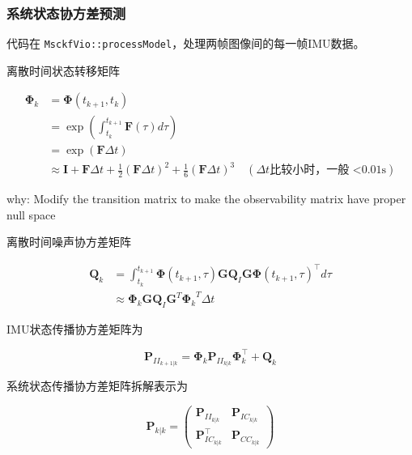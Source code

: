 \documentclass[12pt,a4paper]{article}
\begin{document}
\subsubsection{系统状态协方差预测}

代码在 \verb|MsckfVio::processModel|，处理两帧图像间的每一帧IMU数据。

离散时间状态转移矩阵

\begin{equation}
\begin{aligned}
\boldsymbol{\Phi}_k 
&= \boldsymbol{\Phi}(t_{k+1}, t_k) \\
&= \exp\left(\int_{t_k}^{t_{k+1}} \mathbf{F}(\tau)d\tau\right) \\
&= \exp(\mathbf{F} \Delta t) \\
&\approx 
\mathbf{I} + \mathbf{F} \Delta t + 
\frac{1}{2} (\mathbf{F} \Delta t)^2 + \frac{1}{6} (\mathbf{F} \Delta t)^3
\quad (\Delta t \text{比较小时，一般 <0.01s})
\end{aligned}
\end{equation}

{\color{red}why: Modify the transition matrix to make the observability matrix have proper null space}

离散时间噪声协方差矩阵

\begin{equation}
\begin{aligned}
\mathbf{Q}_k 
&=
\int_{t_k}^{t_{k+1}} \boldsymbol{\Phi}(t_{k+1},\tau)\mathbf{G}\mathbf{Q}_I\mathbf{G}\boldsymbol{\Phi}(t_{k+1},\tau)^\top d\tau \\
&\approx 
\boldsymbol{\Phi}_k \mathbf{G} \mathbf{Q}_I \mathbf{G}^T {\boldsymbol{\Phi}_k}^T \Delta t
\end{aligned}
\end{equation}

IMU状态传播协方差矩阵为

\begin{equation}
\mathbf{P}_{II_{k+1|k}} = 
\boldsymbol{\Phi}_k\mathbf{P}_{II_{k|k}}\boldsymbol{\Phi}_k^\top + \mathbf{Q}_k
\end{equation}

系统状态传播协方差矩阵拆解表示为

\begin{equation}
\mathbf{P}_{k|k} = 
\begin{pmatrix}
\mathbf{P}_{II_{k|k}} & \mathbf{P}_{IC_{k|k}} \\
\mathbf{P}_{IC_{k|k}}^\top & \mathbf{P}_{CC_{k|k}}
\end{pmatrix}
\end{equation}
\end{document}
